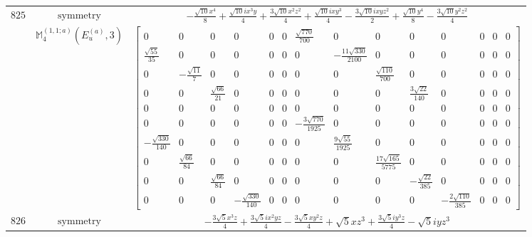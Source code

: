 \documentclass[fleqn,8pt,landscape]{jsarticle}
\begin{document}
\begin{longtable}{ccc}
$ 825 $ & $ \text{symmetry} $ & $ - \frac{\sqrt{10} x^{4}}{8} + \frac{\sqrt{10} i x^{3} y}{4} + \frac{3 \sqrt{10} x^{2} z^{2}}{4} + \frac{\sqrt{10} i x y^{3}}{4} - \frac{3 \sqrt{10} i x y z^{2}}{2} + \frac{\sqrt{10} y^{4}}{8} - \frac{3 \sqrt{10} y^{2} z^{2}}{4} $ \\
$  $ & $ \mathbb{M}_{4}^{(1,1;a)}(E_{u}^{(a)},3) $ & $ \begin{bmatrix} 0 & 0 & 0 & 0 & 0 & 0 & \frac{\sqrt{770}}{700} & 0 & 0 & 0 & 0 & 0 & 0 & 0 \\ \frac{\sqrt{55}}{35} & 0 & 0 & 0 & 0 & 0 & 0 & - \frac{11 \sqrt{330}}{2100} & 0 & 0 & 0 & 0 & 0 & 0 \\ 0 & - \frac{\sqrt{11}}{7} & 0 & 0 & 0 & 0 & 0 & 0 & \frac{\sqrt{110}}{700} & 0 & 0 & 0 & 0 & 0 \\ 0 & 0 & \frac{\sqrt{66}}{21} & 0 & 0 & 0 & 0 & 0 & 0 & \frac{3 \sqrt{22}}{140} & 0 & 0 & 0 & 0 \\ 0 & 0 & 0 & 0 & 0 & 0 & 0 & 0 & 0 & 0 & 0 & 0 & 0 & 0 \\ 0 & 0 & 0 & 0 & 0 & 0 & - \frac{3 \sqrt{770}}{1925} & 0 & 0 & 0 & 0 & 0 & 0 & 0 \\ - \frac{\sqrt{330}}{140} & 0 & 0 & 0 & 0 & 0 & 0 & \frac{9 \sqrt{55}}{1925} & 0 & 0 & 0 & 0 & 0 & 0 \\ 0 & \frac{\sqrt{66}}{84} & 0 & 0 & 0 & 0 & 0 & 0 & \frac{17 \sqrt{165}}{5775} & 0 & 0 & 0 & 0 & 0 \\ 0 & 0 & \frac{\sqrt{66}}{84} & 0 & 0 & 0 & 0 & 0 & 0 & - \frac{\sqrt{22}}{385} & 0 & 0 & 0 & 0 \\ 0 & 0 & 0 & - \frac{\sqrt{330}}{140} & 0 & 0 & 0 & 0 & 0 & 0 & - \frac{2 \sqrt{110}}{385} & 0 & 0 & 0 \end{bmatrix} $ \\ \hline
$ 826 $ & $ \text{symmetry} $ & $ - \frac{3 \sqrt{5} x^{3} z}{4} + \frac{3 \sqrt{5} i x^{2} y z}{4} - \frac{3 \sqrt{5} x y^{2} z}{4} + \sqrt{5} x z^{3} + \frac{3 \sqrt{5} i y^{3} z}{4} - \sqrt{5} i y z^{3} $ \\

\end{longtable}
\end{document}

